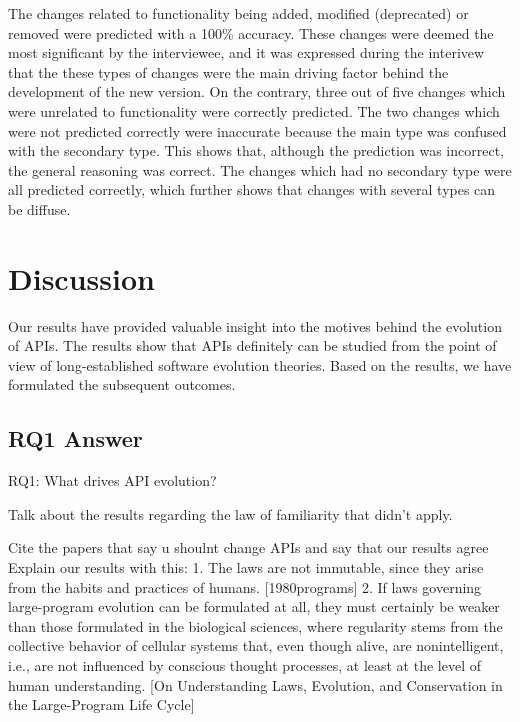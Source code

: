 \documentclass{sig-alternate}
\begin{document}
The changes related to functionality being added, modified (deprecated) or removed were predicted with a 100\% accuracy. These changes were deemed the most significant by the interviewee, and it was expressed during the interivew that the these types of changes were the main driving factor behind the development of the new version. On the contrary, three out of five changes which were unrelated to functionality were correctly predicted. The two changes which were not predicted correctly were inaccurate because the main type was confused with the secondary type. This shows that, although the prediction was incorrect, the general reasoning was correct. The changes which had no secondary type were all predicted correctly, which further shows that changes with several types can be diffuse. 





\section{Discussion} \label{discussion}
Our results have provided valuable insight into the motives behind the evolution of APIs. The results show that APIs definitely can be studied from the point of view of long-established software evolution theories. Based on the results, we have formulated the subsequent outcomes. 

\subsection{RQ1 Answer}  
RQ1: What drives API evolution?


Talk about the results regarding the law of familiarity that didn't apply. 



Cite the papers that say u shoulnt change APIs and say that our results agree \cite{google_talk, henning2007api, mcdonnell2013empirical, robbes2012developers} 
Explain our results with this: 
       1. The laws are not immutable, since they arise from the habits and practices of humans. [1980programs]
       2. If laws governing large-program evolution can be formulated at all, they must certainly be weaker than those formulated in the biological sciences, where regularity stems from the collective behavior of cellular systems that, even though alive, are nonintelligent, i.e., are not influenced by conscious thought processes, at least at the level of human understanding. [On Understanding Laws, Evolution, and Conservation in the Large-Program Life Cycle]
\end{document}
